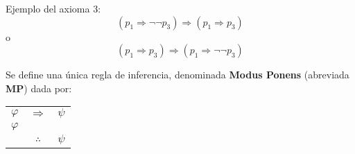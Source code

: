 \documentclass[12pt]{report}
\renewcommand{\theenumii}{\roman{enumii}}
\theoremstyle{largebreak}
\begin{document}
    \begin{exa}
        Ejemplo del axioma 3:
        \begin{equation*}
            (p_1\Rightarrow\neg\neg p_3)\Rightarrow(p_1\Rightarrow p_3)
        \end{equation*}
        o
        \begin{equation*}
            (p_1\Rightarrow p_3)\Rightarrow(p_1\Rightarrow\neg\neg p_3)
        \end{equation*}
    \end{exa}

    \begin{mydef}
        Se define una única regla de inferencia, denominada \textbf{Modus Ponens} (abreviada \textbf{MP}) dada por:
        \begin{center}
            \begin{tabular}{c c c}
                $\varphi$ & $\Rightarrow$ & $\psi$ \\
                $\varphi$ &  &  \\
                \hline
                 & $\therefore$ & $\psi$ \\
            \end{tabular}
        \end{center}
    \end{mydef}

    \renewcommand{\theenumi}{\arabic{enumi}}

    \renewcommand{\theenumii}{\arabic{enumi}.\roman{enumii}}

    \renewcommand{\theenumiii}{\roman{enumi}.\roman{enumii}.\alph{enumiii}}
\end{document}

